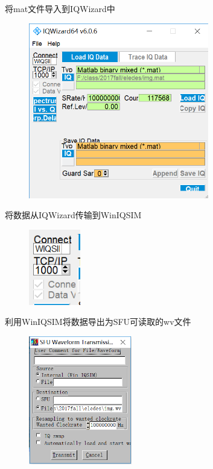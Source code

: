 \documentclass[UTF8]{ctexart}
\begin{document}
将mat文件导入到IQWizard中

\begin{figure}[H]
        \centering
        \includegraphics[width=0.7\textwidth]{images//loadmat.png}
\end{figure}

将数据从IQWizard传输到WinIQSIM

\begin{figure}[H]
        \centering
        \includegraphics[width=0.2\textwidth]{images//transform.png}
\end{figure}

利用WinIQSIM将数据导出为SFU可读取的wv文件

\begin{figure}[H]
        \centering
        \includegraphics[width=0.4\textwidth]{images//getwv.png}
\end{figure}
\end{document}
